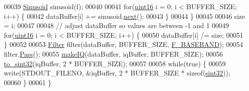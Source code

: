 \begin{DoxyCode}
00039         \hyperlink{classradio_1_1Sinusoid}{Sinusoid} sinusoid(f);
00040 
00041         \textcolor{keywordflow}{for}(\hyperlink{definitions_8hpp_a05f6b0ae8f6a6e135b0e290c25fe0e4e}{uint16} i = 0; i < BUFFER\_SIZE; i++) \{
00042             dataBuffer[i] += sinusoid.\hyperlink{classradio_1_1Sinusoid_aab44298ea1bd5cb175d5826243cf56f2}{next}();
00043         \}
00044     \}
00045 
00046     size = i;
00047     
00048     \textcolor{comment}{// adjust dataBuffer so values are between -1 and 1}
00049     \textcolor{keywordflow}{for}(\hyperlink{definitions_8hpp_a05f6b0ae8f6a6e135b0e290c25fe0e4e}{uint16} i = 0; i < BUFFER\_SIZE; i++) \{
00050         dataBuffer[i] /= size;
00051     \}
00052     
00053     \hyperlink{classradio_1_1Filter}{Filter} filter(dataBuffer, BUFFER\_SIZE, \hyperlink{namespaceradio_a9bd902e9216499953a5906de73dc1796}{F\_BASEBAND});
00054     filter.\hyperlink{classradio_1_1Filter_ad2793821801780809af385463bf8f197}{Pass}();
00055     \hyperlink{namespaceradio_a7166522e76ff88e8d482491b1b6e2275}{makeIQ}(dataBuffer, iqBuffer, BUFFER\_SIZE);
00056     \hyperlink{namespaceradio_ae4b2334c4366dcdf0311ad79d2067945}{to\_sint32}(iqBuffer, 2 * BUFFER\_SIZE);
00057 
00058     \textcolor{keywordflow}{while}(\textcolor{keyword}{true}) \{
00059         write(STDOUT\_FILENO, &iqBuffer, 2 * BUFFER\_SIZE * \textcolor{keyword}{sizeof}(\hyperlink{definitions_8hpp_a0573de65958b4fda3a0460ed417dafb8}{sint32}));
00060     \}
00061 \}
\end{DoxyCode}
